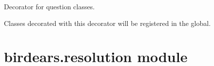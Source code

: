 \documentclass[letterpaper,10pt,english]{sphinxmanual}
\begin{document}

\begin{fulllineitems}
\label{\detokenize{birdears:birdears.questionbase.get_valid_pitches}}
\end{fulllineitems}


\begin{fulllineitems}
\label{\detokenize{birdears:birdears.questionbase.register_question_class}}
Decorator for question classes.

Classes decorated with this decorator will be registered in the
 global.

\end{fulllineitems}



\section{birdears.resolution module}
\label{\detokenize{birdears:birdears-resolution-module}}\label{\detokenize{birdears:module-birdears.resolution}}
\end{document}
